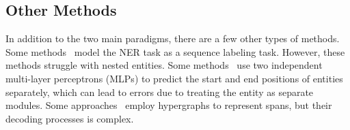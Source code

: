 \subsection{Other Methods}

In addition to the two main paradigms, there are a few other types of methods. 
Some methods~\cite{ma2016end,yan2019tener,strakova2019neural} model the NER task as a sequence labeling task. 
However, these methods struggle with nested entities. 
Some methods~\cite{li2019unified,tan2021sequence,shen2022parallel} use two independent multi-layer perceptrons (MLPs) to predict the start and end positions of entities separately, which can lead to errors due to treating the entity as separate modules. 
Some approaches~\cite{lou-etal-2022-nested,yang-tu-2022-bottom} employ hypergraphs to represent spans, but their decoding processes is complex.